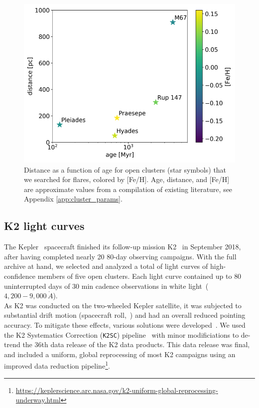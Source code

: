 \documentclass{aa}
\begin{document}
     \begin{figure}[t]
            \includegraphics[width=\hsize]{pics/clusters/openclusters_logage_vs_distance.png}
         \caption{Distance as a function of age for open clusters (star symbols) that we searched for flares, colored by [Fe/H]. Age, distance, and [Fe/H] are approximate values from a compilation of existing literature, see Appendix \ref{app:cluster_params}.}
         \label{fig:OCs}
   \end{figure}

\subsection{K2 light curves}
\label{sec:sec:k2lc}
The Kepler~\citep{koch2010} spacecraft finished its follow-up mission K2~\citep{howell_k2_2014} in September 2018, after having completed nearly 20 80-day observing campaigns. With the full archive at hand, we selected and analyzed a total of light curves of high-confidence members of five open clusters. Each light curve contained up to $80$ uninterrupted days of $30$ min cadence observations in white light~($4,200-9,000\,\mathring{A}$).
\\
As K2 was conducted on the two-wheeled Kepler satellite, it was subjected to substantial drift motion (spacecraft roll,~\citealt{van_cleve_thats_2016}) and had an overall reduced pointing accuracy. To mitigate these effects, various solutions were developed~\citep{vanderburg_k2sff_2014, aigrain_k2sc_2016, luger_everest_2016, luger_everst_2018}. We used the K2 Systematics Correction (\texttt{K2SC}) pipeline~\citep{aigrain_k2sc_2016} with minor modificiations to de-trend the 36th data release of the K2 data products. This data release was final, and included a uniform, global reprocessing of most K2 campaigns using an improved data reduction pipeline\footnote{\url{https://keplerscience.arc.nasa.gov/k2-uniform-global-reprocessing-underway.html}}.
\end{document}
